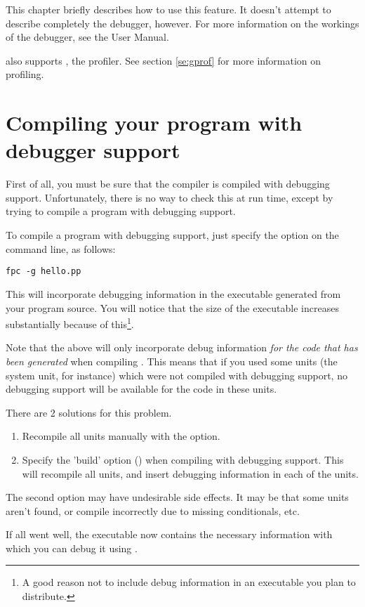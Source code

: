 This chapter briefly describes how to use this feature. It doesn't attempt
to describe completely the \gnu debugger, however.
For more information on the workings of the \gnu debugger, see the 
User Manual.

\fpc also supports , the \gnu profiler. See section \ref{se:gprof}
for more information on profiling.

\section{Compiling your program with debugger support}
First of all, you must be sure that the compiler is compiled with debugging
support. Unfortunately, there is no way to check this at run time, except by
trying to compile a program with debugging support.

To compile a program with debugging support, just specify the 
option on the command line, as follows:
\begin{verbatim}
fpc -g hello.pp
\end{verbatim}
This will incorporate debugging information in the executable generated
from your program source. You will notice that the size of the executable
increases substantially because of this\footnote{A good reason not to include debug
information in an executable you plan to distribute.}.

Note that the above will only incorporate debug information {\em for the code
that has been generated} when compiling . This means that if
you used some units (the system unit, for instance) which were not compiled
with debugging support, no debugging support will be available for the code
in these units.

There are 2 solutions for this problem.
\begin{enumerate}
\item Recompile all units manually with the  option.
\item Specify the 'build' option () when compiling with debugging
support. This will recompile all units, and insert debugging information in
each of the units.
\end{enumerate}
The second option may have undesirable side effects. It may be that some
units aren't found, or compile incorrectly due to missing conditionals,
etc.

If all went well, the executable now contains the necessary information with
which you can debug it using \gnu {}.


